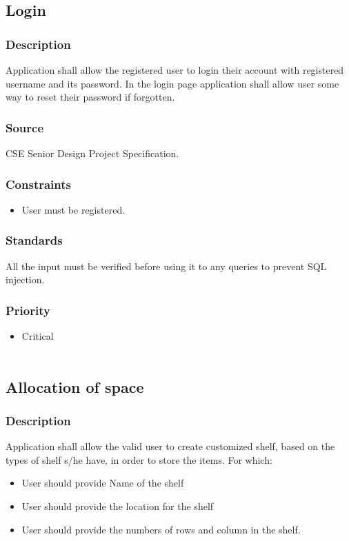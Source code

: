 \subsection{Login}
\subsubsection{Description}
Application shall allow the registered user to login their account with registered username and its password. In the login page application shall allow user some way to reset their password if forgotten. 
\subsubsection{Source}
CSE Senior Design Project Specification.
\subsubsection{Constraints}
\begin{itemize}
\item User must be registered. 
\end{itemize}
\subsubsection{Standards}
All the input must be verified before using it to any queries to prevent SQL injection. 
\subsubsection{Priority}
\begin{itemize}
\item Critical\\ \\
\end{itemize}

\subsection{Allocation of space}
\subsubsection{Description}
Application shall allow the valid user to create customized shelf, based on the types of shelf s/he have, in order to store the items. For which:
\begin{itemize}
\item User should provide Name of the shelf
\item User should provide the location for the shelf
\item User should provide the numbers of rows and column in the shelf.
\end{itemize}
